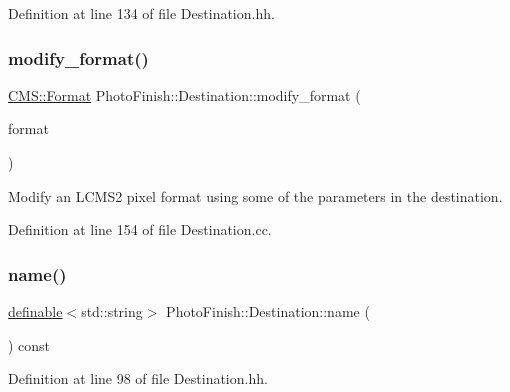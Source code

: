 Definition at line 134 of file Destination.\+hh.

\mbox{\label{class_photo_finish_1_1_destination_a374870bcd20dc05ec7dec1e1f2cfb4cc}} 
\subsubsection{\texorpdfstring{modify\+\_\+format()}{modify\_format()}}
{\footnotesize\ttfamily \hyperlink{class_c_m_s_1_1_format}{C\+M\+S\+::\+Format} Photo\+Finish\+::\+Destination\+::modify\+\_\+format (\begin{DoxyParamCaption}\item[{\hyperlink{class_c_m_s_1_1_format}{C\+M\+S\+::\+Format}}]{format }\end{DoxyParamCaption})}



Modify an L\+C\+M\+S2 pixel format using some of the parameters in the destination. 



Definition at line 154 of file Destination.\+cc.

\mbox{\label{class_photo_finish_1_1_destination_a96d21769385305f7b9168b43ba562019}} 
\subsubsection{\texorpdfstring{name()}{name()}}
{\footnotesize\ttfamily \hyperlink{class_photo_finish_1_1definable}{definable}$<$std\+::string$>$ Photo\+Finish\+::\+Destination\+::name (\begin{DoxyParamCaption}\item[{void}]{ }\end{DoxyParamCaption}) const\hspace{0.3cm}{\ttfamily [inline]}}



Definition at line 98 of file Destination.\+hh.

\mbox{\label{class_photo_finish_1_1_destination_a3ce775300f3de5f1808c49ca751c8634}} 

